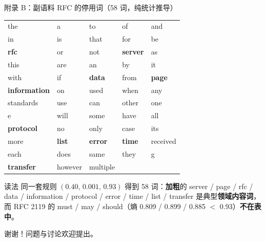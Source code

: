 \documentclass[UTF8,fontset=none,aspectratio=169,10pt]{ctexbeamer}
\newcommand{\key}[1]{\textcolor{accent}{\textbf{#1}}}
\newcommand{\bad}[1]{\textcolor{alertred}{\textbf{#1}}}
\newcommand{\src}[1]{\par\vspace{0.5em}{\fontsize{8}{9.6}\selectfont\color{gray}#1\par}}
\newcommand{\vsp}{\vspace*{\stretch{1}}}
\begin{document}
\begin{frame}{附录 B：副语料 RFC 的停用词（58 词，纯统计推导）}
  \centering
  \footnotesize
  \begin{tabular*}{0.97\textwidth}{@{\extracolsep{\fill}}lllll}
    the & a & to & of & and \\
    in & is & that & for & be \\
    \key{rfc} & or & not & \key{server} & as \\
    this & are & an & by & it \\
    with & if & \key{data} & from & \key{page} \\
    \key{information} & on & used & when & any \\
    standards & use & can & other & one \\
    e & will & some & have & all \\
    \key{protocol} & no & only & case & its \\
    more & \key{list} & \key{error} & \key{time} & received \\
    each & does & same & they & g \\
    \key{transfer} & however & multiple & & \\
  \end{tabular*}
  \vspace{0.15em}
  \begin{block}{读法}
    \footnotesize
    同一套规则 $(0.40,\,0.001,\,0.93)$ 得到 58 词：\key{加粗}的 server / page / rfc / data /
    information / protocol / error / time / list / transfer 是典型\key{领域内容词}，
    而 RFC 2119 的 must / may / should（熵 0.809 / 0.899 / 0.885 $<$ 0.93）\bad{不在表中}。
  \end{block}
  \vsp
  \centering\small\color{gray}谢谢！问题与讨论欢迎提出。
\end{frame}
\end{document}
